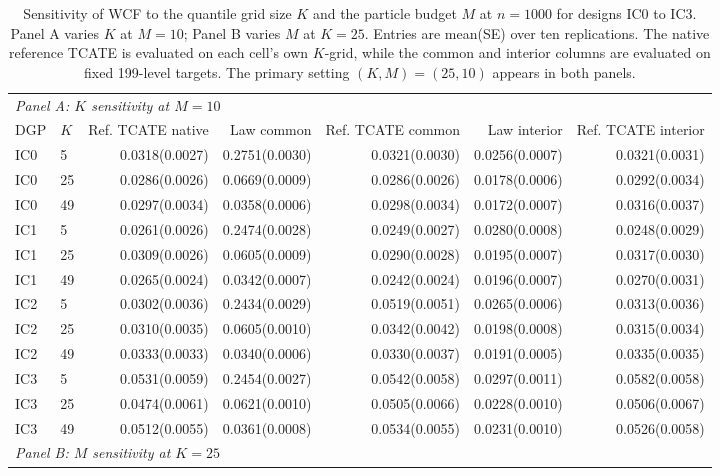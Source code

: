 \begin{table}[t]
\centering
\scriptsize
\setlength{\tabcolsep}{3pt}
\caption{Sensitivity of WCF to the quantile grid size $K$ and the particle budget $M$ at $n=1000$ for designs IC0 to IC3. Panel A varies $K$ at $M=10$; Panel B varies $M$ at $K=25$. Entries are mean(SE) over ten replications. The native reference TCATE is evaluated on each cell's own $K$-grid, while the common and interior columns are evaluated on fixed 199-level targets. The primary setting $(K,M)=(25,10)$ appears in both panels.}
\label{tab:sensitivity-km}
\begin{tabular}{llrrrrr}
\toprule
\multicolumn{7}{l}{\textit{Panel A: $K$ sensitivity at $M=10$}} \\
DGP & $K$ & Ref. TCATE native & Law common & Ref. TCATE common & Law interior & Ref. TCATE interior \\
\midrule
IC0 & 5 & 0.0318(0.0027) & 0.2751(0.0030) & 0.0321(0.0030) & 0.0256(0.0007) & 0.0321(0.0031) \\
IC0 & 25 & 0.0286(0.0026) & 0.0669(0.0009) & 0.0286(0.0026) & 0.0178(0.0006) & 0.0292(0.0034) \\
IC0 & 49 & 0.0297(0.0034) & 0.0358(0.0006) & 0.0298(0.0034) & 0.0172(0.0007) & 0.0316(0.0037) \\
IC1 & 5 & 0.0261(0.0026) & 0.2474(0.0028) & 0.0249(0.0027) & 0.0280(0.0008) & 0.0248(0.0029) \\
IC1 & 25 & 0.0309(0.0026) & 0.0605(0.0009) & 0.0290(0.0028) & 0.0195(0.0007) & 0.0317(0.0030) \\
IC1 & 49 & 0.0265(0.0024) & 0.0342(0.0007) & 0.0242(0.0024) & 0.0196(0.0007) & 0.0270(0.0031) \\
IC2 & 5 & 0.0302(0.0036) & 0.2434(0.0029) & 0.0519(0.0051) & 0.0265(0.0006) & 0.0313(0.0036) \\
IC2 & 25 & 0.0310(0.0035) & 0.0605(0.0010) & 0.0342(0.0042) & 0.0198(0.0008) & 0.0315(0.0034) \\
IC2 & 49 & 0.0333(0.0033) & 0.0340(0.0006) & 0.0330(0.0037) & 0.0191(0.0005) & 0.0335(0.0035) \\
IC3 & 5 & 0.0531(0.0059) & 0.2454(0.0027) & 0.0542(0.0058) & 0.0297(0.0011) & 0.0582(0.0058) \\
IC3 & 25 & 0.0474(0.0061) & 0.0621(0.0010) & 0.0505(0.0066) & 0.0228(0.0010) & 0.0506(0.0067) \\
IC3 & 49 & 0.0512(0.0055) & 0.0361(0.0008) & 0.0534(0.0055) & 0.0231(0.0010) & 0.0526(0.0058) \\
\midrule
\multicolumn{7}{l}{\textit{Panel B: $M$ sensitivity at $K=25$}} \\

\end{tabular}
\end{table}
